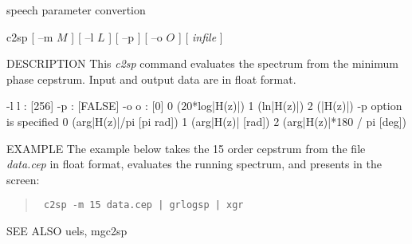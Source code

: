 {speech parameter convertion}

\begin{synopsis}
\item[c2sp] [ --m $M$ ] [ --l $L$ ] [ --p ] [ --o $O$ ] [ {\em infile} ]
\end{synopsis}

\begin{qsection}{DESCRIPTION}
This {\em c2sp} command evaluates the spectrum from the minimum phase
 cepstrum.
 Input and output data are in float format.
\end{qsection}

\begin{options}
       -l l  :          [256]
       -p    :          [FALSE]
       -o o  :         [0]
                0 (20*log|H(z)|)
                1 (ln|H(z)|)
                2 (|H(z)|)
               -p option is specified
                0 (arg|H(z)|/pi       [pi rad])
                1 (arg|H(z)|          [rad])
                2 (arg|H(z)|*180 / pi [deg])
\end{options}

\begin{qsection}{EXAMPLE}
The example below takes the 15 order cepstrum from the file
 {\em data.cep} in float format, evaluates the running spectrum,
 and presents in the screen:
\begin{quote}
 \verb! c2sp -m 15 data.cep | grlogsp | xgr ! 
\end{quote}
\end{qsection}

\begin{qsection}{SEE ALSO}
uels, mgc2sp
\end{qsection}
